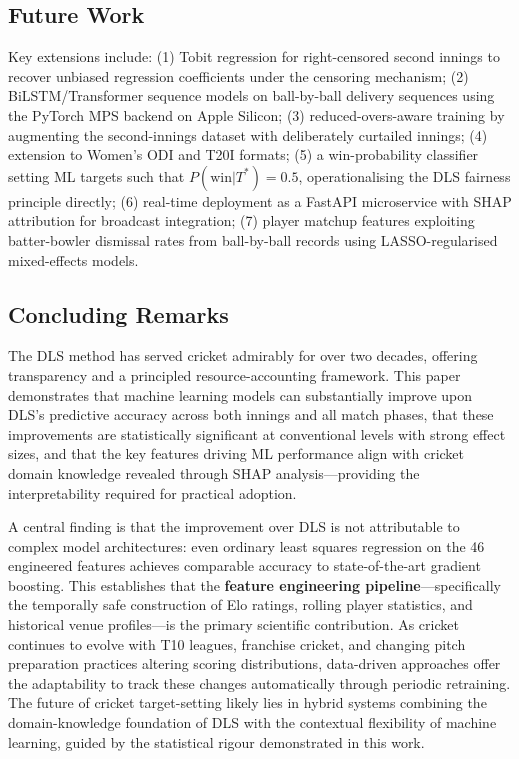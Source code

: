 \documentclass[10pt,a4paper,twocolumn]{article}
\begin{document}
\subsection{Future Work}

Key extensions include: (1) Tobit regression for right-censored second innings to recover unbiased regression coefficients under the censoring mechanism; (2) BiLSTM/Transformer sequence models on ball-by-ball delivery sequences using the PyTorch MPS backend on Apple Silicon; (3) reduced-overs-aware training by augmenting the second-innings dataset with deliberately curtailed innings; (4) extension to Women's ODI and T20I formats; (5) a win-probability classifier setting ML targets such that $P(\text{win} | T^*) = 0.5$, operationalising the DLS fairness principle directly; (6) real-time deployment as a FastAPI microservice with SHAP attribution for broadcast integration; (7) player matchup features exploiting batter-bowler dismissal rates from ball-by-ball records using LASSO-regularised mixed-effects models.

\subsection{Concluding Remarks}

The DLS method has served cricket admirably for over two decades, offering transparency and a principled resource-accounting framework. This paper demonstrates that machine learning models can substantially improve upon DLS's predictive accuracy across both innings and all match phases, that these improvements are statistically significant at conventional levels with strong effect sizes, and that the key features driving ML performance align with cricket domain knowledge revealed through SHAP analysis---providing the interpretability required for practical adoption.

A central finding is that the improvement over DLS is not attributable to complex model architectures: even ordinary least squares regression on the 46 engineered features achieves comparable accuracy to state-of-the-art gradient boosting. This establishes that the \textbf{feature engineering pipeline}---specifically the temporally safe construction of Elo ratings, rolling player statistics, and historical venue profiles---is the primary scientific contribution. As cricket continues to evolve with T10 leagues, franchise cricket, and changing pitch preparation practices altering scoring distributions, data-driven approaches offer the adaptability to track these changes automatically through periodic retraining. The future of cricket target-setting likely lies in hybrid systems combining the domain-knowledge foundation of DLS with the contextual flexibility of machine learning, guided by the statistical rigour demonstrated in this work.
\end{document}
